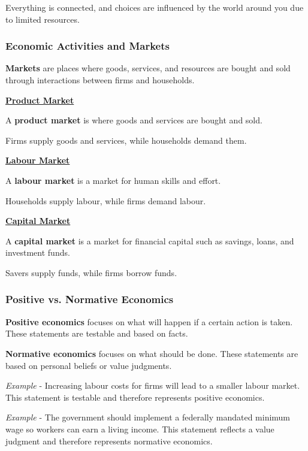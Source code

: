 Everything is connected, and choices are influenced by the world around you due to limited resources.



\subsubsection{Economic Activities and Markets}

\textbf{Markets} are places where goods, services, and resources are bought and sold through interactions between firms and households.



\underline{\textbf{Product Market}}

A \textbf{product market} is where goods and services are bought and sold.

Firms supply goods and services, while households demand them.



\underline{\textbf{Labour Market}}

A \textbf{labour market} is a market for human skills and effort.

Households supply labour, while firms demand labour.



\underline{\textbf{Capital Market}}

A \textbf{capital market} is a market for financial capital such as savings, loans, and investment funds.

Savers supply funds, while firms borrow funds.



\subsubsection{Positive vs. Normative Economics}

\textbf{Positive economics} focuses on what will happen if a certain action is taken. These statements are testable and based on facts.

\textbf{Normative economics} focuses on what should be done. These statements are based on personal beliefs or value judgments.

\textit{Example} - Increasing labour costs for firms will lead to a smaller labour market. This statement is testable and therefore represents positive economics.

\textit{Example} - The government should implement a federally mandated minimum wage so workers can earn a living income. This statement reflects a value judgment and therefore represents normative economics.